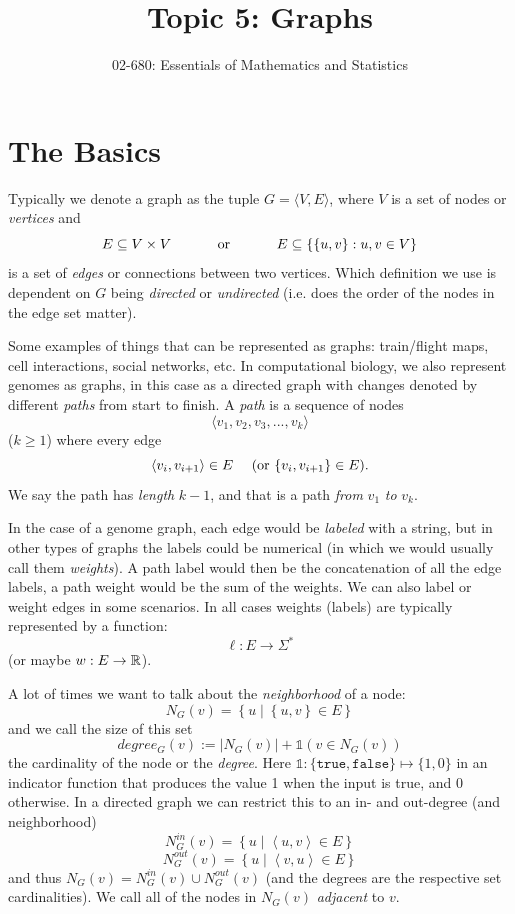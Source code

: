 


\title{Topic 5: Graphs}
\author{02-680: Essentials of Mathematics and Statistics}


\maketitle

\section{The Basics}
Typically we denote a graph as the tuple $G=\langle V, E\rangle$, 
where $V$ is a set of nodes or \emph{vertices} and 
\[E\subseteq V\times V \textnormal{\hspace{3em} or \hspace{3em}} E\subseteq \left\{\left\{u,v\right\} : u,v \in V\right\}\] 
is a set of \emph{edges} or connections between two vertices.
Which definition we use is dependent on $G$ being \emph{directed} or \emph{undirected} (i.e. does the order of the nodes in the edge set matter).  

Some examples of things that can be represented as graphs: train/flight maps, cell interactions, social networks, etc. 
In computational biology, we also represent genomes as graphs, in this case as a directed graph with changes denoted by different \emph{paths} from start to finish. 
A \textit{path} is a sequence of nodes \[\langle v_1, v_2, v_3,...,v_k \rangle\] ($k\ge 1$) where every edge \[\langle v_{i}, v_{i+1}\rangle \in E\textnormal{\hspace{1em} (or  }\{ v_{i}, v_{i+1}\} \in E\textnormal{).}\]
We say the path has \emph{length} $k-1$, and that is a path \textit{from} $v_1$ \textit{to} $v_k$.

In the case of a genome graph, each edge would be \emph{labeled} with a string, but in other types of graphs the labels could be numerical 
(in which we would usually call them \textit{weights}).
A path label would then be the concatenation of all the edge labels, a path weight would be the sum of the weights. 
We can also label or weight edges in some scenarios. 
In all cases weights (labels) are typically represented by a function:
\[\ell: E \rightarrow \Sigma^* \]
(or maybe $w: E \rightarrow \operatorname{\mathbb{R}}$).

A lot of times we want to talk about the \emph{neighborhood} of a node: 
\[N_G(v) = \left\{ u \mid \left\{u,v\right\} \in E\right\}\]
and we call the size of this set \[degree_G(v) := \left|N_G(v)\right| + \mathds{1}\left(v \in N_G\left(v\right)\right)\] the cardinality of the node or the \emph{degree}. 
Here $\mathds{1}: \{\texttt{true},\texttt{false}\}\mapsto\{1,0\}$ in an indicator function that produces the value 1 when the input is true, and 0 otherwise.  
In a directed graph we can restrict this to an in- and out-degree (and neighborhood)
\[N^{in}_G(v) = \left\{ u \mid \left\langle u,v\right\rangle \in E\right\}\]
\[N^{out}_G(v) = \left\{ u \mid \left\langle v,u\right\rangle \in E\right\}\]
and thus $N_G(v) = N^{in}_G(v) \cup N^{out}_G(v)$ (and the degrees are the respective set cardinalities). 
We call all of the nodes in $N_G(v)$ \emph{adjacent} to $v$. 

